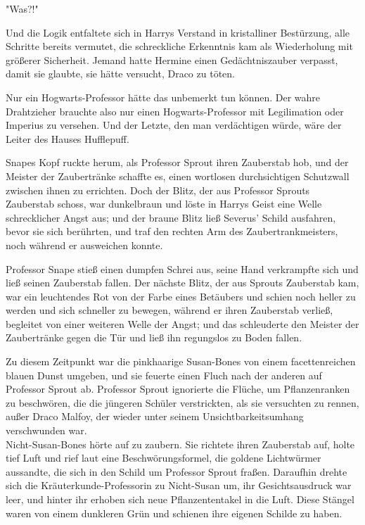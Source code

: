 {"Was?!"

Und die Logik entfaltete sich in Harrys Verstand in kristalliner Bestürzung, alle Schritte bereits vermutet, die schreckliche Erkenntnis kam als Wiederholung mit größerer Sicherheit. Jemand hatte Hermine einen Gedächtniszauber verpasst, damit sie glaubte, sie hätte versucht, Draco zu töten.

Nur ein Hogwarts-Professor hätte das unbemerkt tun können. Der wahre Drahtzieher brauchte also nur einen Hogwarts-Professor mit Legilimation oder Imperius zu versehen. Und der Letzte, den man verdächtigen würde, wäre der Leiter des Hauses Hufflepuff.

Snapes Kopf ruckte herum, als Professor Sprout ihren Zauberstab hob, und der Meister der Zaubertränke schaffte es, einen wortlosen durchsichtigen Schutzwall zwischen ihnen zu errichten. Doch der Blitz, der aus Professor Sprouts Zauberstab schoss, war dunkelbraun und löste in Harrys Geist eine Welle schrecklicher Angst aus; und der braune Blitz ließ Severus' Schild ausfahren, bevor sie sich berührten, und traf den rechten Arm des Zaubertrankmeisters, noch während er ausweichen konnte.

Professor Snape stieß einen dumpfen Schrei aus, seine Hand verkrampfte sich und ließ seinen Zauberstab fallen. Der nächste Blitz, der aus Sprouts Zauberstab kam, war ein leuchtendes Rot von der Farbe eines Betäubers und schien noch heller zu werden und sich schneller zu bewegen, während er ihren Zauberstab verließ, begleitet von einer weiteren Welle der Angst; und das schleuderte den Meister der Zaubertränke gegen die Tür und ließ ihn regungslos zu Boden fallen.

Zu diesem Zeitpunkt war die pinkhaarige Susan-Bones von einem facettenreichen blauen Dunst umgeben, und sie feuerte einen Fluch nach der anderen auf Professor Sprout ab. Professor Sprout ignorierte die Flüche, um Pflanzenranken zu beschwören, die die jüngeren Schüler verstrickten, als sie versuchten zu rennen, außer Draco Malfoy, der wieder unter seinem Unsichtbarkeitsumhang verschwunden war.\\ Nicht-Susan-Bones hörte auf zu zaubern. Sie richtete ihren Zauberstab auf, holte tief Luft und rief laut eine Beschwörungsformel, die goldene Lichtwürmer aussandte, die sich in den Schild um Professor Sprout fraßen. Daraufhin drehte sich die Kräuterkunde-Professorin zu Nicht-Susan um, ihr Gesichtsausdruck war leer, und hinter ihr erhoben sich neue Pflanzententakel in die Luft. Diese Stängel waren von einem dunkleren Grün und schienen ihre eigenen Schilde zu haben.

}
